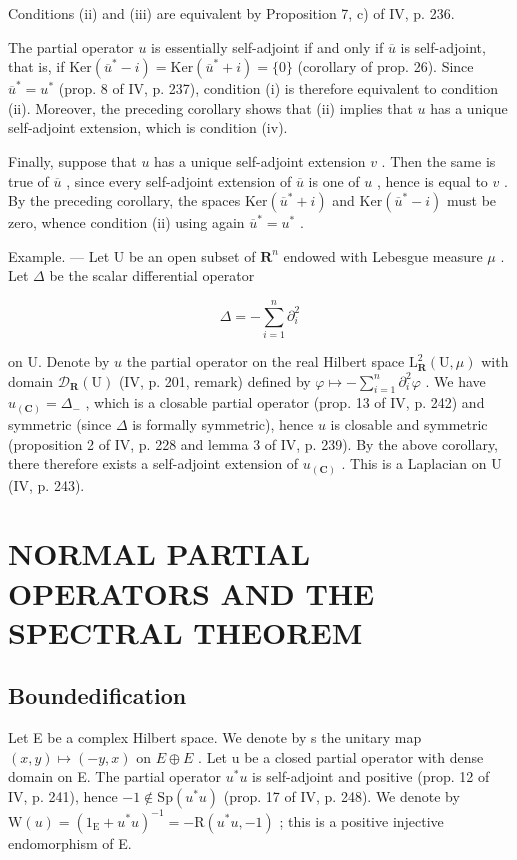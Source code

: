 Conditions (ii) and (iii) are equivalent by Proposition 7, c) of IV, p. 236.

The partial operator \(u\) is essentially self-adjoint if and only if \(\overline{u}\) is self-adjoint, that is, if \(\text{Ker}(\overline{u}^* - i) = \text{Ker}(\overline{u}^* + i) = \{0\}\) (corollary of prop. 26). Since \(\overline{u}^* = u^*\) (prop. 8 of IV, p. 237), condition (i) is therefore equivalent to condition (ii). Moreover, the preceding corollary shows that (ii) implies that \(u\) has a unique self-adjoint extension, which is condition (iv).

Finally, suppose that \(u\) has a unique self-adjoint extension \(v\) . Then the same is true of \(\overline{u}\) , since every self-adjoint extension of \(\overline{u}\) is one of \(u\) , hence is equal to \(v\) . By the preceding corollary, the spaces \(\mathrm{Ker}(\overline{u}^{*} + i)\) and \(\mathrm{Ker}(\overline{u}^{*} - i)\) must be zero, whence condition (ii) using again \(\overline{u}^{*} = u^{*}\) .

Example. --- Let U be an open subset of \(\mathbf{R}^{n}\) endowed with Lebesgue measure \(\mu\) . Let \(\Delta\) be the scalar differential operator

\[
\Delta = - \sum_ {i = 1} ^ {n} \partial_ {i} ^ {2}
\]

on U. Denote by \(u\) the partial operator on the real Hilbert space \(\mathrm{L}_{\mathbf{R}}^{2}(\mathrm{U},\mu)\) with domain \(\mathcal{D}_{\mathbf{R}}(\mathrm{U})\) (IV, p. 201, remark) defined by \(\varphi \mapsto -\sum_{i=1}^{n}\partial_{i}^{2}\varphi\) . We have \(u_{(\mathbf{C})} = \Delta_{-}\) , which is a closable partial operator (prop. 13 of IV, p. 242) and symmetric (since \(\Delta\) is formally symmetric), hence \(u\) is closable and symmetric (proposition 2 of IV, p. 228 and lemma 3 of IV, p. 239). By the above corollary, there therefore exists a self-adjoint extension of \(u_{(\mathbf{C})}\) . This is a Laplacian on U (IV, p. 243).

\section{NORMAL PARTIAL OPERATORS AND THE SPECTRAL THEOREM}

\subsection{Boundedification}

Let E be a complex Hilbert space. We denote by s the unitary map \((x,y)\mapsto(-y,x)\) on \(E\oplus E\) . Let u be a closed partial operator with dense domain on E. The partial operator \(u^{*}u\) is self-adjoint and positive (prop. 12 of IV, p. 241), hence \(-1\notin\mathrm{Sp}(u^{*}u)\) (prop. 17 of IV, p. 248). We denote by \(\mathrm{W}(u)=(1_{\mathrm{E}}+u^{*}u)^{-1}=-\mathrm{R}(u^{*}u,-1)\) ; this is a positive injective endomorphism of E.

